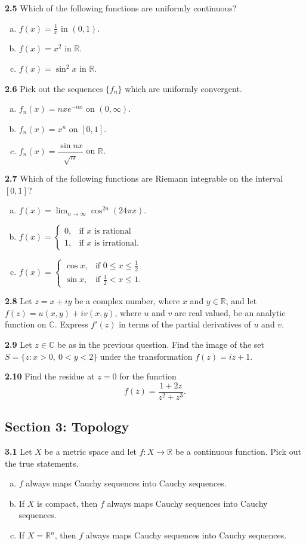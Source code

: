 \documentclass[11pt,a4paper]{article}
\newcommand{\R}{\mathbb{R}}
\newcommand{\C}{\mathbb{C}}
\newcommand{\examsec}[1]{%
  \subsection*{#1}
  \vspace{-2pt}
}
\newcommand{\qitem}[1]{\par\medskip\noindent\textbf{#1}\hspace{0.5em}}
\begin{document}
\qitem{2.5} Which of the following functions are uniformly continuous?
\begin{enumerate}[(a)]
  \item $f(x) = \frac{1}{x}$ in $(0, 1)$.
  \item $f(x) = x^2$ in $\R$.
  \item $f(x) = \sin^2 x$ in $\R$.
\end{enumerate}

\qitem{2.6} Pick out the sequences $\{f_n\}$ which are uniformly convergent.
\begin{enumerate}[(a)]
  \item $f_n(x) = nxe^{-nx}$ on $(0, \infty)$.
  \item $f_n(x) = x^n$ on $[0, 1]$.
  \item $f_n(x) = \dfrac{\sin nx}{\sqrt{n}}$ on $\R$.
\end{enumerate}

\qitem{2.7} Which of the following functions are Riemann integrable on the interval $[0, 1]$?
\begin{enumerate}[(a)]
  \item $f(x) = \lim_{n \to \infty} \cos^{2n}(24\pi x)$.
  \item $f(x) = \begin{cases} 0, & \text{if } x \text{ is rational} \\ 1, & \text{if } x \text{ is irrational.} \end{cases}$
  \item $f(x) = \begin{cases} \cos x, & \text{if } 0 \le x \le \frac{1}{2} \\ \sin x, & \text{if } \frac{1}{2} < x \le 1. \end{cases}$
\end{enumerate}

\qitem{2.8} Let $z = x + iy$ be a complex number, where $x$ and $y \in \R$, and let $f(z) = u(x, y) + iv(x, y)$, where $u$ and $v$ are real valued, be an analytic function on $\C$. Express $f'(z)$ in terms of the partial derivatives of $u$ and $v$.

\qitem{2.9} Let $z \in \C$ be as in the previous question. Find the image of the set $S = \{z : x > 0,\ 0 < y < 2\}$ under the transformation $f(z) = iz + 1$.

\qitem{2.10} Find the residue at $z = 0$ for the function
\[
  f(z) = \frac{1 + 2z}{z^2 + z^3}.
\]

\examsec{Section 3: Topology}

\qitem{3.1} Let $X$ be a metric space and let $f : X \to \R$ be a continuous function. Pick out the true statements.
\begin{enumerate}[(a)]
  \item $f$ always maps Cauchy sequences into Cauchy sequences.
  \item If $X$ is compact, then $f$ always maps Cauchy sequences into Cauchy sequences.
  \item If $X = \R^n$, then $f$ always maps Cauchy sequences into Cauchy sequences.
\end{enumerate}
\end{document}

